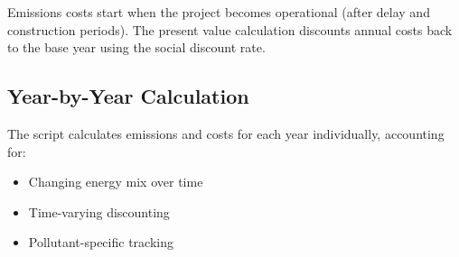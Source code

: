 \documentclass[ctcc_full_documentation.tex]{subfiles}
\begin{document}
Emissions costs start when the project becomes operational (after delay and construction periods). The present value calculation discounts annual costs back to the base year using the social discount rate.

\subsection{Year-by-Year Calculation}

The script calculates emissions and costs for each year individually, accounting for:
\begin{itemize}
    \item Changing energy mix over time
    \item Time-varying discounting
    \item Pollutant-specific tracking
\end{itemize}
\end{document}

